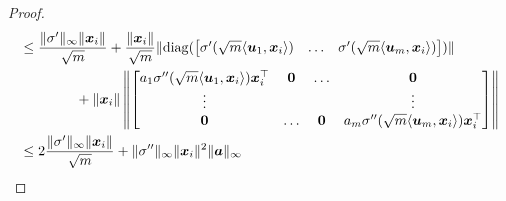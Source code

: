 \documentclass[11pt]{article} %
\newcommand{\<}{\langle}
\renewcommand{\>}{\rangle}
\newcommand{\diag}{\text{diag}}
\def\bzero{{\boldsymbol 0}}
\def\ba{{\boldsymbol a}}
\def\bu{{\boldsymbol u}}
\def\bx{{\boldsymbol x}}
\def\diag{{\rm diag}}
\theoremstyle{plain}
\theoremstyle{definition}
\theoremstyle{remark}
\begin{document}
\begin{proof}
\begin{align*}
&\leq \frac{\|\sigma'\|_{\infty}\|\bx_i\|}{\sqrt{m}} + \frac{\|\bx_i\|}{\sqrt{m}} \|\diag(\begin{bmatrix} \sigma'(\sqrt{m}\<\bu_1,\bx_i\>) &  \ldots & \sigma'(\sqrt{m}\<\bu_m,\bx_i\>) \end{bmatrix})\| \\
&\quad\quad\quad\quad + \|\bx_i\| \left\|\begin{bmatrix} a_1\sigma''(\sqrt{m}\<\bu_1,\bx_i\>)\bx_i^{\top} & \bzero & \ldots & \bzero \\
\vdots & & & \vdots \\
\bzero & \ldots & \bzero & a_m\sigma''(\sqrt{m}\<\bu_m,\bx_i\>)\bx_i^{\top} \end{bmatrix} \right\| \\
&\leq 2\frac{\|\sigma'\|_{\infty} \|\bx_i\|}{\sqrt{m}} + \|\sigma''\|_{\infty} \|\bx_i\|^2 \|\ba\|_{\infty}
\end{align*}



\end{proof}
\end{document}
